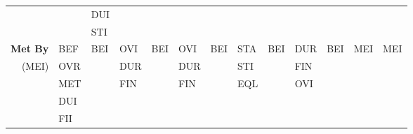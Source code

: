 \documentclass[11pt]{report}
\newenvironment{vvarmargin}[2]
{
  \begin{list}{}
  {
    \setlength{\topsep}{0pt}
    \setlength{\leftmargin}{0pt}
    \setlength{\rightmargin}{0pt}
    \setlength{\listparindent}{\parindent}
    \setlength{\itemindent}{\parindent}
    \setlength{\parsep}{0pt plus 1pt}
    \addtolength{\leftmargin}{#1}\addtolength{\rightmargin}{#2}
  }
  \item
}
{
  \end{list}
}
\begin{document}
\begin{table}[p]
\begin{vvarmargin}{-4cm}{-4cm}
\begin{center}
\begin{tabular}[t]{|r|l|l|l|l|l|l|l|l|l|l|l|l|}
                                        &                         & DUI                     &                         &                         &                         &                         &                         &                         &                         &                         &                         &                         \\
                                        &                         & STI                     &                         &                         &                         &                         &                         &                         &                         &                         &                         &                         \\
                \hline
                \textbf{Met By}         & BEF                     & BEI                     & OVI                     & BEI                     & OVI                     & BEI                     & STA                     & BEI                     & DUR                     & BEI                     & MEI                     & MEI                     \\
                (MEI)                   & OVR                     &                         & DUR                     &                         & DUR                     &                         & STI                     &                         & FIN                     &                         &                         &                         \\
                                        & MET                     &                         & FIN                     &                         & FIN                     &                         & EQL                     &                         & OVI                     &                         &                         &                         \\
                                        & DUI                     &                         &                         &                         &                         &                         &                         &                         &                         &                         &                         &                         \\
                                        & FII                     &                         &                         &                         &                         &                         &                         &                         &                         &                         &                         &                         \\

\end{tabular}
\end{center}
\end{vvarmargin}
\end{table}
\end{document}
